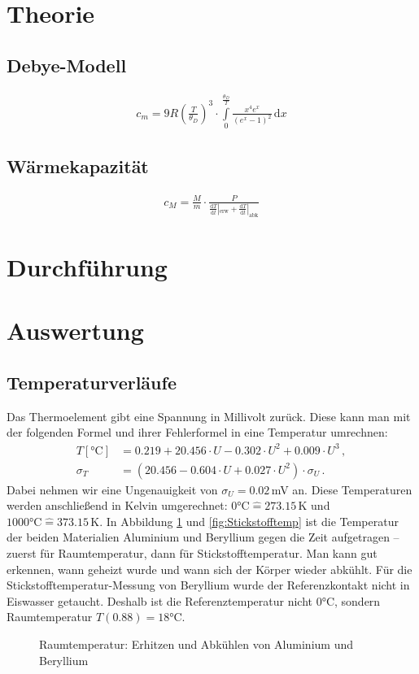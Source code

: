 \documentclass[12pt,a4paper,titlepage,headinclude,bibtotoc]{scrartcl}
\newcommand{\corresponds}{\ensuremath{\mathrel{\widehat{=}}}}
\newcommand{\dif}{\ensuremath{\mathrm{d}}}
\begin{document}
\section{Theorie}
\label{sec:theorie}

\subsection{Debye-Modell}
\begin{align}
	c_m=9R \left(\frac{T}{\theta_D}\right)^3\cdot\int\limits_0^\frac{\theta_D}{T} \frac{x^4 e^x}{(e^x-1)^2} \,\dif x
	\label{eq:debye}
\end{align}

\subsection{Wärmekapazität}
\begin{align}
	c_M=\frac{M}{m}\cdot\frac{P}{\frac{\dif T}{\dif t}|_\text{erw}+\frac{\dif T}{\dif t}|_\text{abk}}
	\label{eq:molWaerme}
\end{align}

\section{Durchführung}
\label{sec:durchfuehrung}

\section{Auswertung}
\label{sec:auswertung}
\subsection{Temperaturverläufe}
Das Thermoelement gibt eine Spannung in Millivolt zurück.
Diese kann man mit der folgenden Formel und ihrer Fehlerformel in eine Temperatur umrechnen:
\begin{align}
	T[\si{\celsius}]&=0.219+20.456 \cdot U - 0.302\cdot U^2+0.009\cdot U^3 \,, \\
	\sigma_T&=(20.456 - 0.604\cdot U+0.027\cdot U^2)\cdot \sigma_U\,.
\end{align}
Dabei nehmen wir eine Ungenauigkeit von $\sigma_U=0.02\,$mV an.
Diese Temperaturen werden anschließend in Kelvin umgerechnet: $0\si\celsius\corresponds 273.15 \, \si\kelvin$ und $1000\si\celsius\corresponds 373.15 \, \si\kelvin$. 
In Abbildung \ref{fig:Raumtemp} und \ref{fig:Stickstofftemp} ist die Temperatur der beiden Materialien Aluminium und Beryllium gegen die Zeit aufgetragen -- zuerst für Raumtemperatur, dann für Stickstofftemperatur.
Man kann gut erkennen, wann geheizt wurde und wann sich der Körper wieder abkühlt.
Für die Stickstofftemperatur-Messung von Beryllium wurde der Referenzkontakt nicht in Eiswasser getaucht.
Deshalb ist die Referenztemperatur nicht $0\si\celsius$, sondern Raumtemperatur $T(0.88)=18\si\celsius$.
\begin{figure}[!htb]
	\centering
	
	\caption{Raumtemperatur: Erhitzen und Abkühlen von Aluminium und Beryllium}
	\label{fig:Raumtemp}
\end{figure}
\end{document}
